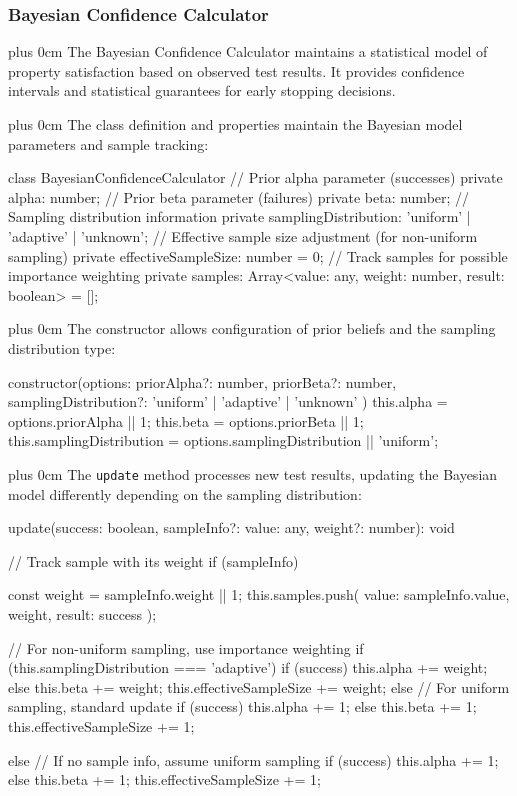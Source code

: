 \documentclass[conference]{IEEEtran}
\newcommand{\justifytext}{\leftskip=0pt \rightskip=0pt plus 0cm}
\begin{document}
\subsubsection{Bayesian Confidence Calculator}

\justifytext
The Bayesian Confidence Calculator maintains a statistical model of property satisfaction based on observed test results. It provides confidence intervals and statistical guarantees for early stopping decisions.

\justifytext
The class definition and properties maintain the Bayesian model parameters and sample tracking:

\begin{wrappedcode}
class BayesianConfidenceCalculator {
  // Prior alpha parameter (successes)
  private alpha: number;
  // Prior beta parameter (failures)
  private beta: number;
  // Sampling distribution information
  private samplingDistribution: 'uniform' | 'adaptive' | 'unknown';
  // Effective sample size adjustment (for non-uniform sampling)
  private effectiveSampleSize: number = 0;
  // Track samples for possible importance weighting
  private samples: Array<{value: any, weight: number, result: boolean}> = [];
}
\end{wrappedcode}

\justifytext
The constructor allows configuration of prior beliefs and the sampling distribution type:

\begin{wrappedcode}
  constructor(options: {
    priorAlpha?: number, 
    priorBeta?: number,
    samplingDistribution?: 'uniform' | 'adaptive' | 'unknown'
  }) {
    this.alpha = options.priorAlpha || 1;
    this.beta = options.priorBeta || 1;
    this.samplingDistribution = options.samplingDistribution || 'uniform';
  }
\end{wrappedcode}

\justifytext
The \texttt{update} method processes new test results, updating the Bayesian model differently depending on the sampling distribution:

\begin{wrappedcode}
  update(success: boolean, sampleInfo?: {value: any, weight?: number}): void {
    // Track sample with its weight
    if (sampleInfo) {
      const weight = sampleInfo.weight || 1;
      this.samples.push({
        value: sampleInfo.value,
        weight,
        result: success
      });
      
      // For non-uniform sampling, use importance weighting
      if (this.samplingDistribution === 'adaptive') {
        if (success) {
          this.alpha += weight;
        } else {
          this.beta += weight;
        }
        this.effectiveSampleSize += weight;
      } else {
        // For uniform sampling, standard update
        if (success) {
          this.alpha += 1;
        } else {
          this.beta += 1;
        }
        this.effectiveSampleSize += 1;
      }
    } else {
      // If no sample info, assume uniform sampling
      if (success) {
        this.alpha += 1;
      } else {
        this.beta += 1;
      }
      this.effectiveSampleSize += 1;
    }
  }
\end{wrappedcode}
\end{document}
